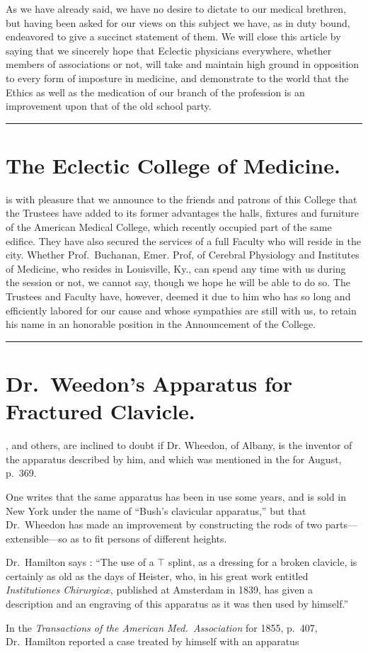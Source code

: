 
As we have already said, we have no desire to dictate to our medical
brethren, but having been asked for our views on this subject we
have, as in duty bound, endeavored to give a succinct statement of them.
We will close this article by saying that we sincerely hope that Eclectic
physicians everywhere, whether members of associations or not, will
take and maintain high ground in opposition to every form of imposture
in medicine, and demonstrate to the world that the Ethics as well
as the medication of our branch of the profession is an improvement
upon that of the old school party.

\fancybreak{*}

\section*{The Eclectic College of Medicine.}

 is with pleasure that we announce to the friends and patrons of this
College that the Trustees have added to its former advantages the halls,
fixtures and furniture of the American Medical College, which recently
occupied part of the same edifice. They have also secured the services
of a full Faculty who will reside in the city. Whether Prof.~Buchanan,
Emer. Prof, of Cerebral Physiology and Institutes of Medicine, who
resides in Louisville, Ky., can spend any time with us during the session
or not, we cannot say, though we hope he will be able to do so. The
Trustees and Faculty have, however, deemed it due to him who has so
long and efficiently labored for our cause and whose sympathies are still
with us, to retain his name in an honorable position in the Announcement
of the College.

\fancybreak{*}

\section*{Dr.~Weedon's Apparatus for Fractured Clavicle.}

, and others, are inclined to doubt if Dr.
Wheedon, of Albany, is the inventor of the apparatus described by him,
and which was mentioned in the  for August, p.\ 369.

One writes that the same apparatus has been in use some years, and
is sold in New York under the name of ``Bush's clavicular apparatus,''
but that Dr.~Wheedon has made an improvement by constructing the
rods of two parts---extensible---so as to fit persons of different heights.

Dr.~Hamilton says : ``The use of a $\top$ splint, as a dressing for a broken
clavicle, is certainly as old as the days of Heister, who, in his great work
entitled \emph{Institutiones Chirurgicæ}, published at Amsterdam in 1839, has
given a description and an engraving of this apparatus as it was then
used by himself.''

In the \emph{Transactions of the American Med.\ Association} for 1855,
p.~407, Dr.~Hamilton reported a case treated by himself with an apparatus\endinput
